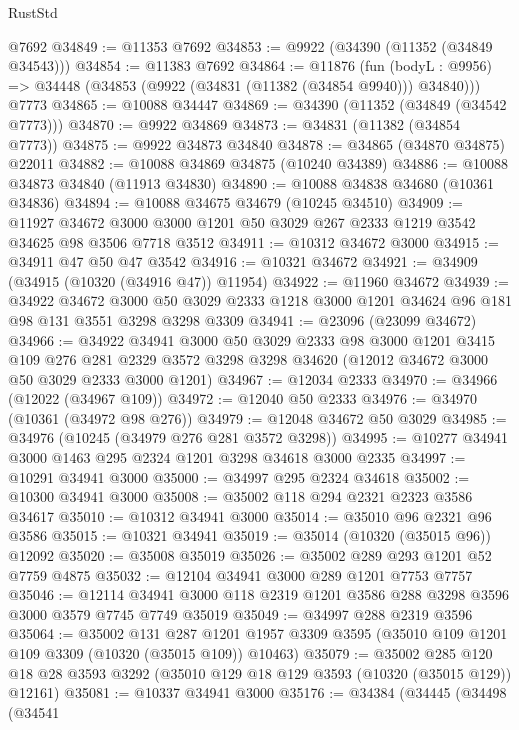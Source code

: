 \begin{lexlean}{RustStd}
\begin{coremodule}
    @7692
@34849 := @11353 @7692
@34853 := @9922 (@34390 (@11352 (@34849 @34543)))
@34854 := @11383 @7692
@34864 := @11876
    (fun (bodyL : @9956) => @34448 (@34853 (@9922 (@34831 (@11382 (@34854 @9940))) @34840)))
    @7773
@34865 := @10088 @34447
@34869 := @34390 (@11352 (@34849 (@34542 @7773)))
@34870 := @9922 @34869
@34873 := @34831 (@11382 (@34854 @7773))
@34875 := @9922 @34873 @34840
@34878 := @34865 (@34870 @34875) @22011
@34882 := @10088 @34869 @34875 (@10240 @34389)
@34886 := @10088 @34873 @34840 (@11913 @34830)
@34890 := @10088 @34838 @34680 (@10361 @34836)
@34894 := @10088 @34675 @34679 (@10245 @34510)
@34909 := @11927
    @34672
    @3000
    @3000
    @1201
    @50
    @3029
    @267
    @2333
    @1219
    @3542
    @34625
    @98
    @3506
    @7718
    @3512
@34911 := @10312 @34672 @3000
@34915 := @34911 @47 @50 @47 @3542
@34916 := @10321 @34672
@34921 := @34909 (@34915 (@10320 (@34916 @47)) @11954)
@34922 := @11960 @34672
@34939 := @34922
    @34672
    @3000
    @50
    @3029
    @2333
    @1218
    @3000
    @1201
    @34624
    @96
    @181
    @98
    @131
    @3551
    @3298
    @3298
    @3309
@34941 := @23096 (@23099 @34672)
@34966 := @34922
    @34941
    @3000
    @50
    @3029
    @2333
    @98
    @3000
    @1201
    @3415
    @109
    @276
    @281
    @2329
    @3572
    @3298
    @3298
    @34620
    (@12012 @34672 @3000 @50 @3029 @2333 @3000 @1201)
@34967 := @12034 @2333
@34970 := @34966 (@12022 (@34967 @109))
@34972 := @12040 @50 @2333
@34976 := @34970 (@10361 (@34972 @98 @276))
@34979 := @12048 @34672 @50 @3029
@34985 := @34976 (@10245 (@34979 @276 @281 @3572 @3298))
@34995 := @10277 @34941 @3000 @1463 @295 @2324 @1201 @3298 @34618 @3000 @2335
@34997 := @10291 @34941 @3000
@35000 := @34997 @295 @2324 @34618
@35002 := @10300 @34941 @3000
@35008 := @35002 @118 @294 @2321 @2323 @3586 @34617
@35010 := @10312 @34941 @3000
@35014 := @35010 @96 @2321 @96 @3586
@35015 := @10321 @34941
@35019 := @35014 (@10320 (@35015 @96)) @12092
@35020 := @35008 @35019
@35026 := @35002 @289 @293 @1201 @52 @7759 @4875
@35032 := @12104 @34941 @3000 @289 @1201 @7753 @7757
@35046 := @12114 @34941 @3000 @118 @2319 @1201 @3586 @288 @3298 @3596 @3000 @3579 @7745 @7749 @35019
@35049 := @34997 @288 @2319 @3596
@35064 := @35002
    @131
    @287
    @1201
    @1957
    @3309
    @3595
    (@35010 @109 @1201 @109 @3309 (@10320 (@35015 @109)) @10463)
@35079 := @35002
    @285
    @120
    @18
    @28
    @3593
    @3292
    (@35010 @129 @18 @129 @3593 (@10320 (@35015 @129)) @12161)
@35081 := @10337 @34941 @3000
@35176 := @34384
    (@34445
      (@34498
        (@34541

\end{coremodule}
\end{lexlean}
